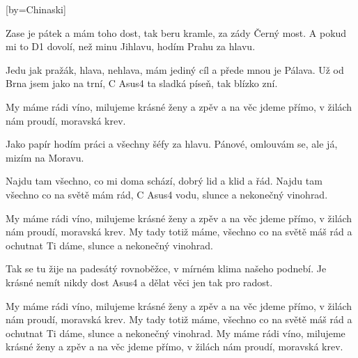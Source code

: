[by={Chinaski}]

\beginverse{}
Zase je pátek a mám toho dost,
tak beru kramle, za zády Černý most.
A pokud mi to D1 dovolí,
než minu Jihlavu, hodím Prahu za hlavu.
\endverse{}

\beginverse{}
\chordsoff{}
Jedu jak pražák, hlava, nehlava,
mám jediný cíl a přede mnou je Pálava.
Už od Brna jsem jako na trní,
C Asus4
ta sladká píseň, tak blízko zní.
\chordson{}
\endverse{}

\beginchorus{}
\lrep{} My máme rádi víno, milujeme krásné ženy a zpěv
a na věc jdeme přímo, v žilách nám proudí, moravská krev. \rrep{}
\endchorus{}

\beginverse{}
\chordsoff{}
Jako papír hodím práci
a všechny šéfy za hlavu.
Pánové, omlouvám se,
ale já, mizím na Moravu.
\chordson{}
\endverse{}

\beginverse{}
\chordsoff{}
Najdu tam všechno, co mi doma schází,
dobrý lid a klid a řád.
Najdu tam všechno co na světě mám rád,
C Asus4
vodu, slunce a nekonečný vinohrad.
\chordson{}
\endverse{}

\beginchorus{}
\chordsoff{}
My máme rádi víno, milujeme krásné ženy a zpěv
a na věc jdeme přímo, v žilách nám proudí, moravská krev.
My tady totiž máme, všechno co na světě máš rád
a ochutnat Ti dáme, slunce a nekonečný vinohrad.
\chordson{}
\endchorus{}

\beginverse*{}
Tak se tu žije na padesátý rovnoběžce,
v mírném klima našeho podnebí.
Je krásné nemít nikdy dost
Asus4
a dělat věci jen tak pro radost.
\endverse{}

\beginchorus{}
\chordsoff{}
My máme rádi víno, milujeme krásné ženy a zpěv
a na věc jdeme přímo, v žilách nám proudí, moravská krev.
My tady totiž máme, všechno co na světě máš rád
a ochutnat Ti dáme, slunce a nekonečný vinohrad.
My máme rádi víno, milujeme krásné ženy a zpěv
a na věc jdeme přímo, v žilách nám proudí, moravská krev.
\chordson{}
\endchorus{}

\endsong{}
